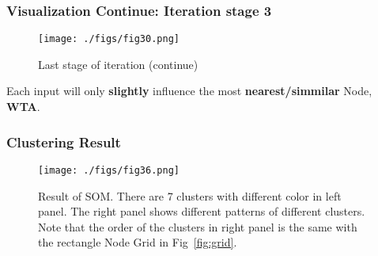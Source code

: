 \begin{frame}
    \frametitle{Visualization Continue: Iteration stage 3}
    \begin{figure}[!hp]
        \centering
        \texttt{[image: ./figs/fig30.png]}
        \caption{Last stage of iteration (continue)}
    \end{figure}
    
    Each input will only \textbf{slightly} influence the most \textbf{nearest/simmilar} Node, \textbf{WTA}. 
\end{frame}

\begin{frame}
    \frametitle{Clustering Result}
    \begin{figure}[!hp]
        \centering
        \texttt{[image: ./figs/fig36.png]}
        \caption{Result of SOM. There are 7 clusters with different color in left panel. 
        The right panel shows different patterns of different clusters. 
        Note that the order of the clusters in right panel is the same with the rectangle Node Grid in Fig~\ref{fig:grid}.}
    \end{figure}
\end{frame}

